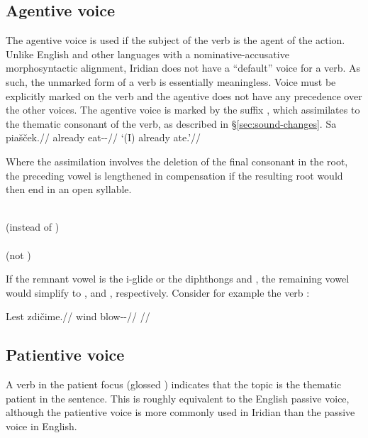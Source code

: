 \subsection{Agentive voice}

The agentive voice is used if the subject of the verb is the agent of the
action. Unlike English and other languages with a nominative-accusative
morphosyntactic alignment, Iridian does not have a ``default'' voice for a verb.
As such, the unmarked form of a verb is essentially meaningless. Voice must be
explicitly marked on the verb and the agentive does not have any precedence over
the other voices. The agentive voice is marked by the suffix , which
assimilates to the thematic consonant of the verb, as described in
\S\ref{sec:sound-changes}.
\pex
\begingl
\gla Sa piašček.//
\glb already eat-\Av{}-\Pf{}//
\glft `(I) already ate.'//
\endgl
\xe

Where the assimilation involves the deletion of the final consonant in the root,
the preceding vowel is lengthened in compensation if the resulting root would
then end in an open syllable.
\begin{multicols}{2}
\pex
{}\\
(instead of )\\
\xe
\pex
{}\\
(not )\\
\xe
\end{multicols}

If the remnant vowel is the i-glide  or the diphthongs  and
, the remaining vowel would simplify to ,  and ,
respectively. Consider for example the verb  :

\pex
\begingl
\gla Lest zdičime.//
\glb wind blow-\Av{}-\Prog{}//
\glft {}//
\endgl
\xe

\subsection{Patientive voice}

A verb in the patient focus (glossed \Pv{}) indicates that the topic is the
thematic patient in the sentence. This is roughly equivalent to the English
passive voice, although the patientive voice is more commonly used in Iridian
than the passive voice in English. 

